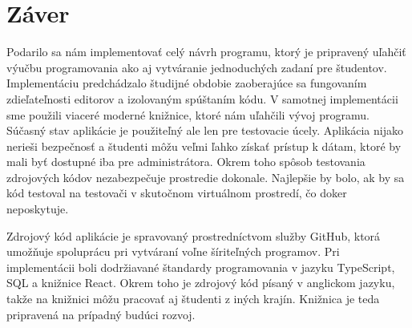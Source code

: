 \chapter*{Záver}  %

Podarilo sa nám implementovať celý návrh programu, ktorý je pripravený uľahčiť výučbu programovania
ako aj vytváranie jednoduchých zadaní pre študentov. Implementáciu predchádzalo študijné obdobie
zaoberajúce sa fungovaním zdieľateľnosti editorov a izolovaným spúštaním kódu. V samotnej
implementácii sme použili viaceré moderné knižnice, ktoré nám uľahčili vývoj programu. Súčasný stav
aplikácie je použiteľný ale len pre testovacie úcely. Aplikácia nijako nerieši bezpečnosť a študenti
môžu veľmi ľahko získať prístup k dátam, ktoré by mali byť dostupné iba pre administrátora. Okrem
toho spôsob testovania zdrojových kódov nezabezpečuje prostredie dokonale. Najlepšie by bolo, ak by
sa kód testoval na testovači v skutočnom virtuálnom prostredí, čo doker neposkytuje.

Zdrojový kód aplikácie je spravovaný prostredníctvom služby GitHub, ktorá umožňuje spoluprácu pri
vytváraní voľne šíriteľných programov. Pri implementácii boli dodržiavané štandardy programovania v
jazyku TypeScript, SQL a knižnice React. Okrem toho je zdrojový kód písaný v anglickom jazyku, takže
na knižnici môžu pracovať aj študenti z iných krajín. Knižnica je teda pripravená na prípadný budúci
rozvoj.
